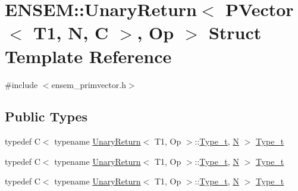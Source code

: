 \hypertarget{structENSEM_1_1UnaryReturn_3_01PVector_3_01T1_00_01N_00_01C_01_4_00_01Op_01_4}{}\section{E\+N\+S\+EM\+:\+:Unary\+Return$<$ P\+Vector$<$ T1, N, C $>$, Op $>$ Struct Template Reference}
\label{structENSEM_1_1UnaryReturn_3_01PVector_3_01T1_00_01N_00_01C_01_4_00_01Op_01_4}


{\ttfamily \#include $<$ensem\+\_\+primvector.\+h$>$}

\subsection*{Public Types}
\begin{DoxyCompactItemize}
\item 
typedef C$<$ typename \mbox{\hyperlink{structENSEM_1_1UnaryReturn}{Unary\+Return}}$<$ T1, Op $>$\+::\mbox{\hyperlink{structENSEM_1_1UnaryReturn_3_01PVector_3_01T1_00_01N_00_01C_01_4_00_01Op_01_4_a4c77aefad12cfcc1bdbcc457ce10d656}{Type\+\_\+t}}, \mbox{\hyperlink{adat__devel_2lib_2hadron_2operator__name__util_8cc_a7722c8ecbb62d99aee7ce68b1752f337}{N}} $>$ \mbox{\hyperlink{structENSEM_1_1UnaryReturn_3_01PVector_3_01T1_00_01N_00_01C_01_4_00_01Op_01_4_a4c77aefad12cfcc1bdbcc457ce10d656}{Type\+\_\+t}}
\item 
typedef C$<$ typename \mbox{\hyperlink{structENSEM_1_1UnaryReturn}{Unary\+Return}}$<$ T1, Op $>$\+::\mbox{\hyperlink{structENSEM_1_1UnaryReturn_3_01PVector_3_01T1_00_01N_00_01C_01_4_00_01Op_01_4_a4c77aefad12cfcc1bdbcc457ce10d656}{Type\+\_\+t}}, \mbox{\hyperlink{adat__devel_2lib_2hadron_2operator__name__util_8cc_a7722c8ecbb62d99aee7ce68b1752f337}{N}} $>$ \mbox{\hyperlink{structENSEM_1_1UnaryReturn_3_01PVector_3_01T1_00_01N_00_01C_01_4_00_01Op_01_4_a4c77aefad12cfcc1bdbcc457ce10d656}{Type\+\_\+t}}
\item 
typedef C$<$ typename \mbox{\hyperlink{structENSEM_1_1UnaryReturn}{Unary\+Return}}$<$ T1, Op $>$\+::\mbox{\hyperlink{structENSEM_1_1UnaryReturn_3_01PVector_3_01T1_00_01N_00_01C_01_4_00_01Op_01_4_a4c77aefad12cfcc1bdbcc457ce10d656}{Type\+\_\+t}}, \mbox{\hyperlink{adat__devel_2lib_2hadron_2operator__name__util_8cc_a7722c8ecbb62d99aee7ce68b1752f337}{N}} $>$ \mbox{\hyperlink{structENSEM_1_1UnaryReturn_3_01PVector_3_01T1_00_01N_00_01C_01_4_00_01Op_01_4_a4c77aefad12cfcc1bdbcc457ce10d656}{Type\+\_\+t}}
\end{DoxyCompactItemize}


